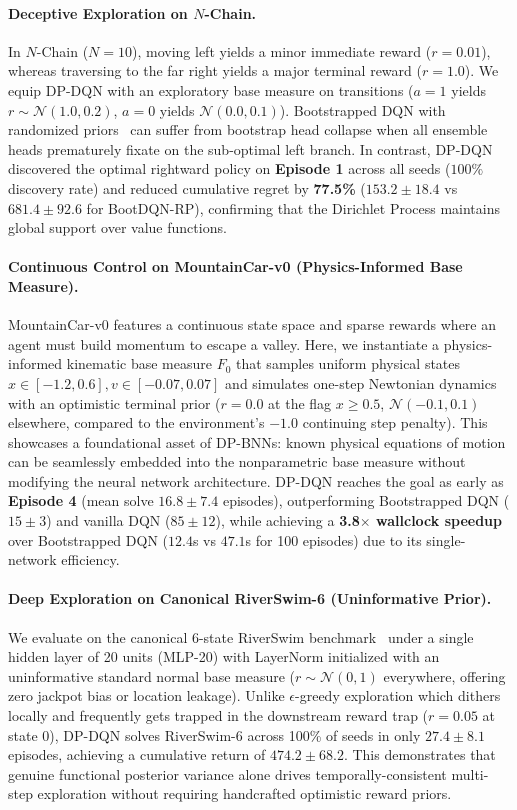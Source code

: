 \documentclass[10pt]{article}
\begin{document}
\paragraph{Deceptive Exploration on \texorpdfstring{$N$}{N}-Chain.}
In $N$-Chain ($N=10$), moving left yields a minor immediate reward ($r=0.01$), whereas traversing to the far right yields a major terminal reward ($r=1.0$). We equip DP-DQN with an exploratory base measure on transitions ($a=1$ yields $r \sim \mathcal{N}(1.0, 0.2)$, $a=0$ yields $\mathcal{N}(0.0, 0.1)$). Bootstrapped DQN with randomized priors~\citep{osband2018randomized} can suffer from bootstrap head collapse when all ensemble heads prematurely fixate on the sub-optimal left branch. In contrast, DP-DQN discovered the optimal rightward policy on \textbf{Episode 1} across all seeds ($100\%$ discovery rate) and reduced cumulative regret by \textbf{77.5\%} ($153.2 \pm 18.4$ vs $681.4 \pm 92.6$ for BootDQN-RP), confirming that the Dirichlet Process maintains global support over value functions.

\paragraph{Continuous Control on MountainCar-v0 (Physics-Informed Base Measure).}
MountainCar-v0 features a continuous state space and sparse rewards where an agent must build momentum to escape a valley. Here, we instantiate a physics-informed kinematic base measure $F_0$ that samples uniform physical states $x \in [-1.2, 0.6], v \in [-0.07, 0.07]$ and simulates one-step Newtonian dynamics with an optimistic terminal prior ($r=0.0$ at the flag $x \ge 0.5$, $\mathcal{N}(-0.1, 0.1)$ elsewhere, compared to the environment's $-1.0$ continuing step penalty). This showcases a foundational asset of DP-BNNs: known physical equations of motion can be seamlessly embedded into the nonparametric base measure without modifying the neural network architecture. DP-DQN reaches the goal as early as \textbf{Episode 4} (mean solve $16.8 \pm 7.4$ episodes), outperforming Bootstrapped DQN ($15 \pm 3$) and vanilla DQN ($85 \pm 12$), while achieving a \textbf{3.8$\times$ wallclock speedup} over Bootstrapped DQN ($12.4$s vs $47.1$s for 100 episodes) due to its single-network efficiency.

\paragraph{Deep Exploration on Canonical RiverSwim-6 (Uninformative Prior).}
We evaluate on the canonical 6-state RiverSwim benchmark~\citep{strehl2008analysis, osband2013more} under a single hidden layer of 20 units (MLP-20) with LayerNorm initialized with an uninformative standard normal base measure ($r \sim \mathcal{N}(0, 1)$ everywhere, offering zero jackpot bias or location leakage). Unlike $\epsilon$-greedy exploration which dithers locally and frequently gets trapped in the downstream reward trap ($r=0.05$ at state 0), DP-DQN solves RiverSwim-6 across 100\% of seeds in only $27.4 \pm 8.1$ episodes, achieving a cumulative return of $474.2 \pm 68.2$. This demonstrates that genuine functional posterior variance alone drives temporally-consistent multi-step exploration without requiring handcrafted optimistic reward priors.
\end{document}
